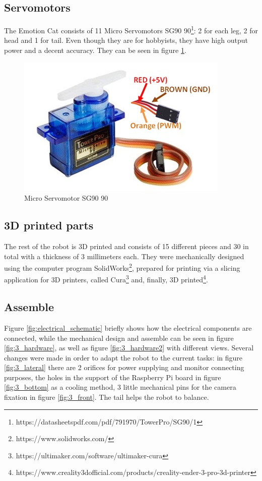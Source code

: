 \documentclass[runningheads,a4paper,12pt]{report}
\begin{document}
\subsection*{Servomotors}
The Emotion Cat consists of 11 Micro Servomotors SG90 90\textdegree\footnote{https://datasheetspdf.com/pdf/791970/TowerPro/SG90/1}: 2 for each leg, 2 for head and 1 for tail. Even though they are for hobbyists, they have high output power and a decent accuracy. They can be seen in figure \ref{fig:servo}.

\begin{figure}
	\centering

  	\includegraphics[width=.6\linewidth]{./images/3_servo}\hfill

    \caption{Micro Servomotor SG90 90\textdegree}  
    \label{fig:servo}
\end{figure}

\subsection*{3D printed parts}
The rest of the robot is 3D printed and consists of 15 different pieces and 30 in total with a thickness of 3 millimeters each. They were mechanically designed using the computer program SolidWorks\footnote{https://www.solidworks.com/}, prepared for printing via a slicing application for 3D printers, called Cura\footnote{https://ultimaker.com/software/ultimaker-cura} and, finally, 3D printed\footnote{https://www.creality3dofficial.com/products/creality-ender-3-pro-3d-printer}.  

\subsection*{Assemble}
Figure \ref{fig:electrical_schematic} briefly shows how the electrical components are connected, while the mechanical design and assemble can be seen in figure \ref{fig:3_hardware}, as well as figure \ref{fig:3_hardware2} with different views. Several changes were made in order to adapt the robot to the current tasks: in figure \ref{fig:3_lateral} there are 2 orifices for power supplying and monitor connecting purposes, the holes in the support of the Raspberry Pi board in figure \ref{fig:3_bottom} as a cooling method, 3 little mechanical pins for the camera fixation in figure \ref{fig:3_front}. The tail helps the robot to balance.
\end{document}
